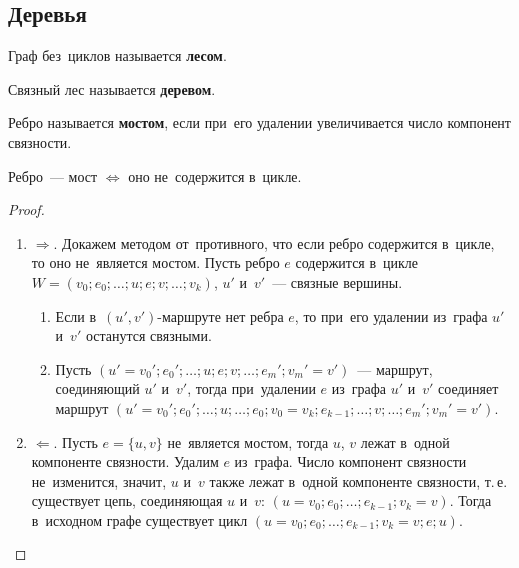 \subsection{Деревья}
Граф без~циклов называется \textbf{лесом}.

Связный лес называется \textbf{деревом}.

Ребро называется \textbf{мостом}, если при~его удалении увеличивается число компонент связности.

\begin{statement}
\label{st:criterion_of_bridge_in_graph}
Ребро~--- мост $\Leftrightarrow$ оно не~содержится в~цикле.
\end{statement}
\begin{proof}
\begin{enumerate}
	\item $\Rightarrow$. Докажем методом от~противного, что если ребро содержится в~цикле, то оно не~является мостом.
	Пусть ребро $e$ содержится в~цикле $W = (v_0; e_0; \ldots; u; e; v; \ldots; v_k)$, $u'$ и~$v'$~--- связные вершины.
	\begin{enumerate}
		\item Если в~$(u', v')$\nobreakdash-\hspace{0pt}маршруте нет ребра $e$, то при~его удалении из~графа $u'$ и~$v'$ останутся связными.
		\item Пусть $(u' = v_0'; e_0'; \ldots; u; e; v; \ldots; e_m'; v_m' = v')$~--- маршрут, соединяющий $u'$ и~$v'$, тогда при~удалении $e$ из~графа $u'$ и~$v'$ соединяет маршрут\newline
		$(u' = v_0'; e_0'; \ldots; u; \ldots; e_0; v_0 = v_k; e_{k-1}; \ldots; v; \ldots; e_m'; v_m' = v')$.
	\end{enumerate}
	
	\item $\Leftarrow$. Пусть $e = \{ u, v \}$ не~является мостом, тогда $u$, $v$ лежат в~одной компоненте связности.
	Удалим $e$ из~графа.
	Число компонент связности не~изменится, значит, $u$ и~$v$ также лежат в~одной компоненте связности, т.\,е. существует цепь, соединяющая $u$ и~$v$: $(u = v_0; e_0; \ldots; e_{k-1}; v_k = v)$.
	Тогда в~исходном графе существует цикл $(u = v_0; e_0; \ldots; e_{k-1}; v_k = v; e; u)$.
\end{enumerate}
\end{proof}

